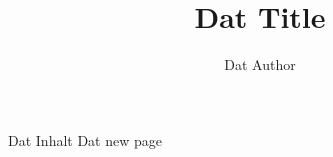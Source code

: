 \documentclass[11pt]{article}
\author{Dat Author}
\title{Dat Title}
\begin{document}
\maketitle

Dat Inhalt
\newpage
Dat new page
\end{document}
